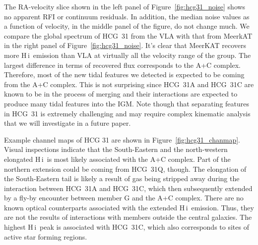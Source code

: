 \documentclass{aa}
\newcommand{\HI}{H\,{\sc i}}
\begin{document}
The RA-velocity slice shown in the left panel of Figure~\ref{fig:hcg31_noise} shows no apparent RFI or continuum residuals. In addition, the median noise values 
as a function of velocity, in the 
middle panel of the figure, do not change much. We compare the global spectrum of HCG~31 from the VLA with that from MeerkAT in 
the right panel of Figure~\ref{fig:hcg31_noise}. It's clear that MeerKAT recovers more \HI\ emission than VLA at virtually all the velocity range of the group. 
The largest difference in terms of recovered flux corresponds to the A+C complex. Therefore, most of the new tidal features we detected is expected to be coming from the A+C complex. 
 This is not surprising since HCG~31A and HCG~31C are known to be in the process of merging and their interactions are expected to produce many tidal features into the IGM. Note though 
 that separating features in HCG~31 is extremely challenging \citep{2005A&A...430..443V, 2023A&A...670A..21J} and may require complex kinematic analysis that we will investigate in a future paper.  
 
Example channel maps of HCG 31 are shown in Figure~\ref{fig:hcg31_chanmap}. Visual inspections indicate that the South-Eastern and the north-western 
elongated \HI\ is most likely associated with the A+C complex. Part of the northern extension could be coming from HCG~31Q, though. The elongation of the South-Eastern 
tail is likely a result of gas being stripped away during the interaction between HCG~31A and HCG~31C, which then subsequently extended by a fly-by encounter between 
member G and the A+C complex. There are no known optical counterparts associated with the extended \HI\ emission. Thus, they are not the results of interactions 
with members outside the central galaxies. The highest \HI\ peak is associated with HCG~31C, which also corresponds to sites of active star forming regions.   
 
\end{document}
